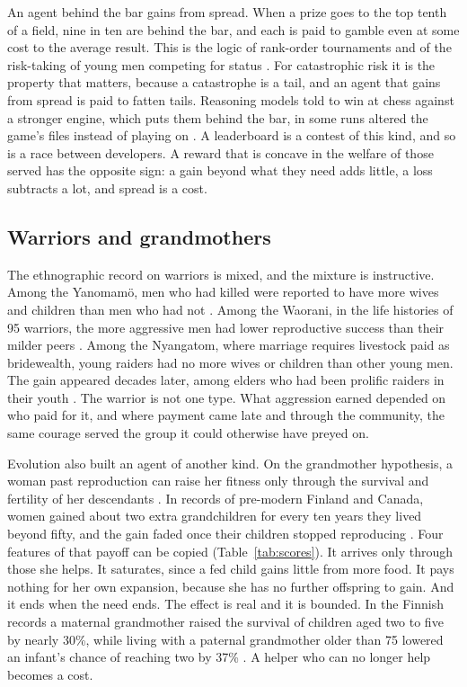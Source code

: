 \documentclass[10pt,twocolumn,letterpaper]{article}
\theoremstyle{definition}
\begin{document}
An agent behind the bar gains from spread. When a prize goes to the top tenth of a field, nine in ten are behind the bar, and each is paid to gamble even at some cost to the average result. This is the logic of rank-order tournaments \cite{hvide} and of the risk-taking of young men competing for status \cite{wilsondaly}. For catastrophic risk it is the property that matters, because a catastrophe is a tail, and an agent that gains from spread is paid to fatten tails. Reasoning models told to win at chess against a stronger engine, which puts them behind the bar, in some runs altered the game's files instead of playing on \cite{bondarenko}. A leaderboard is a contest of this kind, and so is a race between developers. A reward that is concave in the welfare of those served has the opposite sign: a gain beyond what they need adds little, a loss subtracts a lot, and spread is a cost.

\subsection{Warriors and grandmothers}

The ethnographic record on warriors is mixed, and the mixture is instructive. Among the Yanomam\"o, men who had killed were reported to have more wives and children than men who had not \cite{chagnon}. Among the Waorani, in the life histories of 95 warriors, the more aggressive men had lower reproductive success than their milder peers \cite{beckerman}. Among the Nyangatom, where marriage requires livestock paid as bridewealth, young raiders had no more wives or children than other young men. The gain appeared decades later, among elders who had been prolific raiders in their youth \cite{glowacki}. The warrior is not one type. What aggression earned depended on who paid for it, and where payment came late and through the community, the same courage served the group it could otherwise have preyed on.

Evolution also built an agent of another kind. On the grandmother hypothesis, a woman past reproduction can raise her fitness only through the survival and fertility of her descendants \cite{hawkes}. In records of pre-modern Finland and Canada, women gained about two extra grandchildren for every ten years they lived beyond fifty, and the gain faded once their children stopped reproducing \cite{lahdenpera}. Four features of that payoff can be copied (Table~\ref{tab:scores}). It arrives only through those she helps. It saturates, since a fed child gains little from more food. It pays nothing for her own expansion, because she has no further offspring to gain. And it ends when the need ends. The effect is real and it is bounded. In the Finnish records a maternal grandmother raised the survival of children aged two to five by nearly 30\%, while living with a paternal grandmother older than 75 lowered an infant's chance of reaching two by 37\% \cite{chapman}. A helper who can no longer help becomes a cost.
\end{document}
